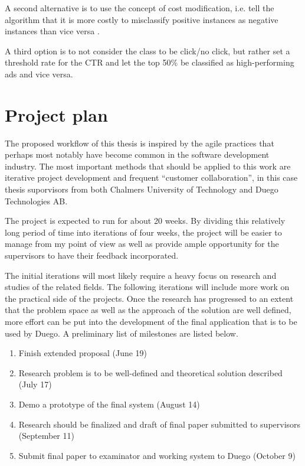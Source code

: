 \documentclass[a4paper]{article}
\begin{document}
A second alternative is to use the concept of cost modification, i.e. tell the algorithm that it is more costly to misclassify
positive instances as negative instances than vice versa \citep{Chawla2004, Japkowicz2002}.

A third option is to not consider the class to be click/no click, but rather set a threshold rate for the CTR and let the top 50\%
be classified as high-performing ads and vice versa.

\section{Project plan}
The proposed workflow of this thesis is inspired by the agile practices that perhaps most notably have become common in the
software development industry. The most important methods that should be applied to this work are iterative project development
and frequent ``customer collaboration'', in this case thesis suporvisors from both Chalmers University of Technology and Duego
Technologies AB.

The project is expected to run for about 20 weeks. By dividing this relatively long period of time into iterations of four weeks,
the project will be easier to manage from my point of view as well as provide ample opportunity for the supervisors to have their
feedback incorporated.

The initial iterations will most likely require a heavy focus on research and studies of the related fields. The following
iterations will include more work on the practical side of the projects. Once the research has progressed to an extent that the
problem space as well as the approach of the solution are well defined, more effort can be put into the development of the final
application that is to be used by Duego. A preliminary list of milestones are listed below.

\begin{enumerate}
	\item Finish extended proposal (June 19)
	\item Research problem is to be well-defined and theoretical solution described (July 17)
	\item Demo a prototype of the final system (August 14)
	\item Research should be finalized and draft of final paper submitted to supervisors (September 11)
	\item Submit final paper to examinator and working system to Duego (October 9)
\end{enumerate}
\end{document}
